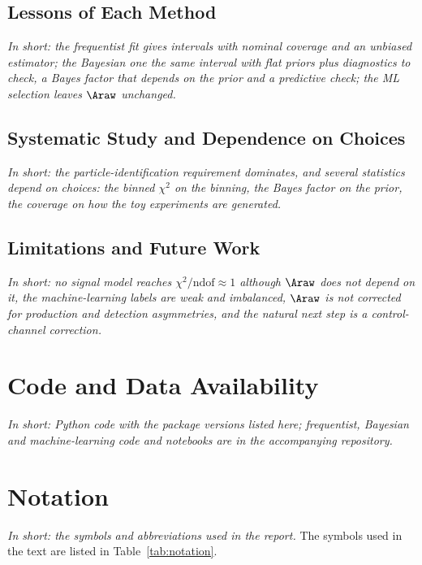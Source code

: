 \subsection{Lessons of Each Method}
\emph{In short: the frequentist fit gives intervals with nominal coverage and an unbiased estimator; the Bayesian one the same interval with flat priors plus diagnostics to check, a Bayes factor that depends on the prior and a predictive check; the ML selection leaves $\Araw$ unchanged.}

\subsection{Systematic Study and Dependence on Choices}
\emph{In short: the particle-identification requirement dominates, and several statistics depend on choices: the binned $\chi^2$ on the binning, the Bayes factor on the prior, the coverage on how the toy experiments are generated.}

\subsection{Limitations and Future Work}
\label{sec:limitations}
\emph{In short: no signal model reaches $\chi^2/\mathrm{ndof}\approx1$ although $\Araw$ does not depend on it, the machine-learning labels are weak and imbalanced, $\Araw$ is not corrected for production and detection asymmetries, and the natural next step is a control-channel correction.}

\FloatBarrier

\section{Code and Data Availability}
\label{sec:code}
\emph{In short: Python code with the package versions listed here; frequentist, Bayesian and machine-learning code and notebooks are in the accompanying repository.}

\FloatBarrier

\section{Notation}
\label{sec:notation}
\emph{In short: the symbols and abbreviations used in the report.}
The symbols used in the text are listed in Table~\ref{tab:notation}.

